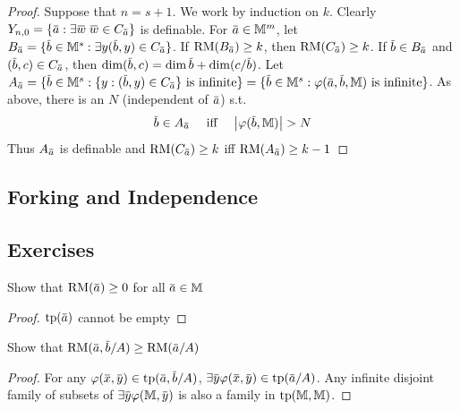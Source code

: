 \documentclass[11pt]{article}
\begin{document}
\begin{proof}
Suppose that \(n=s+1\). We work by induction on \(k\).
Clearly \(Y_{n,0}=\{\bara:\exists\barw\;\barw\in C_{\bara}\}\) is definable. For \(\bara\in\M^m\),
let \(B_{\bara}=\{\barb\in\M^s:\exists y(\barb,y)\in C_{\bara}\}\). If \(\RM(B_{\bara})\ge k\),
then \(\RM(C_{\bara})\ge k\).
If \(\barb\in B_{\bara}\) and \((\barb,c)\in C_{\bara}\),
then \(\dim(\barb,c)=\dim\barb+\dim(c/\barb)\).
Let
\(A_{\bara}=\{\barb\in\M^s:\{y:(\barb,y)\in C_{\bara}\}\text{ is infinite}\}=\{\barb\in\M^s:\varphi(\bara,\barb,\M)\text{ is infinite}\}\).
As above, there is an \(N\) (independent of \(\bara\)) s.t.
\begin{equation*}
\barb\in A_{\bara} \quad\text{ iff }\quad\abs{\varphi(\barb,\M)}>N
\end{equation*}
Thus \(A_{\bara}\) is definable and \(\RM(C_{\bara})\ge k\) iff \(\RM(A_{\bara})\ge k-1\)
\end{proof}
\subsection{Forking and Independence}
\label{sec:org3ec92ee}

\subsection{Exercises}
\label{sec:org0035bd8}
\begin{exercise}
\label{ex6.6.10}
Show that \(\RM(\bara)\ge 0\) for all \(\bara\in\M\)
\end{exercise}

\begin{proof}
\(\tp(\bara)\) cannot be empty
\end{proof}

\begin{exercise}
\label{ex6.6.11}
Show that \(\RM(\bara,\barb/A)\ge\RM(\bara/A)\)
\end{exercise}

\begin{proof}
For any \(\varphi(\barx,\bary)\in\tp(\bara,\barb/A)\), \(\exists\bary\varphi(\barx,\bary)\in\tp(\bara/A)\). Any
infinite disjoint family of subsets of \(\exists\bary\varphi(\M,\bary)\) is also a family in \(\operatorname{tp}(\mathbb{M},\mathbb{M})\).
\end{proof}
\end{document}

